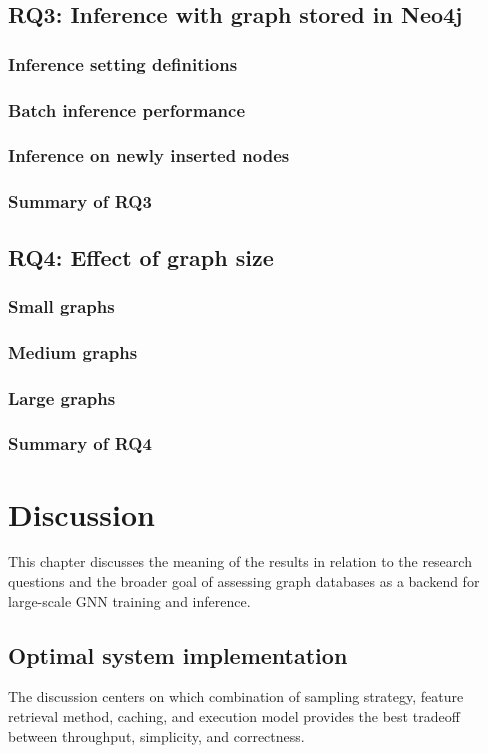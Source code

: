 \documentclass[PhD,single]{uclathes}
\begin{document}
\section{RQ3: Inference with graph stored in Neo4j}
\subsection{Inference setting definitions}
\subsection{Batch inference performance}
\subsection{Inference on newly inserted nodes}
\subsection{Summary of RQ3}

\section{RQ4: Effect of graph size}
\subsection{Small graphs}
\subsection{Medium graphs}
\subsection{Large graphs}
\subsection{Summary of RQ4}

\chapter{Discussion}

This chapter discusses the meaning of the results in relation to the research
questions and the broader goal of assessing graph databases as a backend for
large-scale GNN training and inference.

\section{Optimal system implementation}
The discussion centers on which combination of sampling strategy, feature
retrieval method, caching, and execution model provides the best tradeoff
between throughput, simplicity, and correctness.
\end{document}

